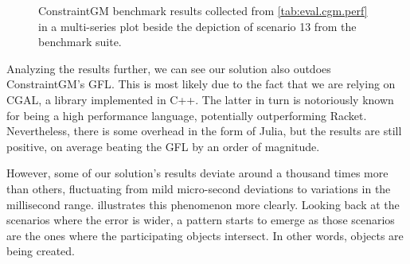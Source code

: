 \begin{figure}[htb]
  \begin{subfigure}[t]{.6\linewidth}
    \centering
    \label{fig:eval.cgm.perf.plot}
  \end{subfigure}
  \hfill
  \begin{subfigure}[t]{.35\linewidth}
    \label{fig:eval.cgm.perf.13}
  \end{subfigure}
  \caption[ConstraintGM benchmarks and Scenario 13]{\label{fig:eval.cgm.perf}%
    ConstraintGM benchmark results collected from \cref{tab:eval.cgm.perf} in a
    multi-series plot  beside the depiction of
    scenario 13  from the benchmark suite.}
\end{figure}

Analyzing the results further, we can see our solution also outdoes
ConstraintGM's \ac{GFL}.  This is most likely due to the fact that we are
relying on \ac{CGAL}, a library implemented in C++.  The latter in turn is
notoriously known for being a high performance language, potentially
outperforming Racket.  Nevertheless, there is some overhead in the form of
Julia, but the results are still positive, on average beating the \ac{GFL} by an
order of magnitude.

However, some of our solution's results deviate around a thousand times more
than others, fluctuating from mild micro-second deviations to variations in the
millisecond range.   illustrates this phenomenon more
clearly.  Looking back at the scenarios where the error is wider, a pattern
starts to emerge as those scenarios are the ones where the participating objects
intersect.  In other words, objects are being created.

